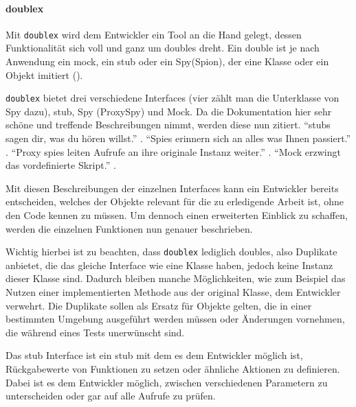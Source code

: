 \paragraph{doublex}\label{python-tools:doublex}\mbox{}
\newline
Mit \lstinline{doublex} wird dem Entwickler ein Tool an die Hand gelegt,
dessen Funktionalität sich voll und ganz um doubles dreht. Ein double ist je
nach Anwendung ein \Gls{mock}, ein \Gls{stub} oder ein Spy(Spion), der eine
Klasse oder ein Objekt imitiert (\cite{doublex:docs:1.8.1}).
\newline

\lstinline{doublex} bietet drei verschiedene Interfaces (vier zählt man die
Unterklasse von Spy dazu), \Gls{stub}, Spy (ProxySpy) und Mock. Da die
Dokumentation hier sehr schöne und treffende Beschreibungen nimmt, werden diese 
nun zitiert. "`\Glspl{stub} sagen dir, was du hören 
willst."' 
. "`Spies erinnern sich 
an alles was Ihnen passiert."' 
. "`Proxy spies leiten Aufrufe an ihre originale 
Instanz weiter."' . "`Mock 
erzwingt das vordefinierte Skript."' 
.

Mit diesen Beschreibungen der einzelnen Interfaces kann ein Entwickler bereits
entscheiden, welches der Objekte relevant für die zu erledigende Arbeit ist, 
ohne
den Code kennen zu müssen. Um dennoch einen erweiterten Einblick zu
schaffen, werden die einzelnen Funktionen nun genauer beschrieben.

Wichtig hierbei ist zu beachten, dass \lstinline{doublex} lediglich
doubles, also Duplikate anbietet, die das gleiche Interface wie eine Klasse
haben, jedoch keine Instanz dieser Klasse sind. Dadurch bleiben manche
Möglichkeiten, wie zum Beispiel das Nutzen einer
implementierten Methode aus der original Klasse, dem Entwickler verwehrt.
Die Duplikate sollen als Ersatz für Objekte gelten, die in einer bestimmten
Umgebung ausgeführt werden müssen oder Änderungen vornehmen, die während
eines Tests unerwünscht sind.

Das \Gls{stub} Interface ist ein \Gls{stub} mit dem es dem Entwickler möglich 
ist, Rückgabewerte von Funktionen zu setzen oder ähnliche Aktionen zu 
definieren. Dabei ist es dem Entwickler möglich, zwischen verschiedenen 
Parametern zu unterscheiden oder gar auf alle Aufrufe zu prüfen.

